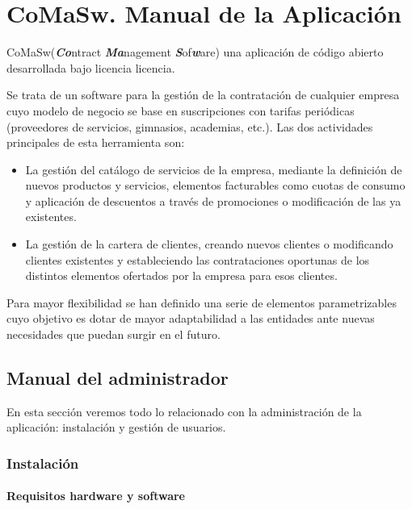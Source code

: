 \chapter{CoMaSw. Manual de la Aplicación}
\label{chap:manual}

\lettrine{CoMaSw} (\emph{\textbf{Co}}ntract \emph{\textbf{Ma}}nagement \emph{\textbf{S}}of\emph{\textbf{w}}are) una aplicación de código abierto desarrollada bajo licencia \acrfull{licencia}.


Se trata de un software para la gestión de la contratación de cualquier empresa cuyo modelo de negocio se base en suscripciones con tarifas periódicas (proveedores de servicios, gimnasios, academias, etc.). Las dos actividades principales de esta herramienta son:
\begin{itemize}
\item La gestión del catálogo de servicios de la empresa, mediante la definición de nuevos productos y servicios, elementos facturables como cuotas de consumo y aplicación de descuentos a través de promociones o modificación de las ya existentes.
\item La gestión de la cartera de clientes, creando nuevos clientes o modificando clientes existentes y estableciendo las contrataciones oportunas de los distintos elementos ofertados por la empresa para esos clientes.
\end{itemize}

Para mayor flexibilidad se han definido una serie de elementos parametrizables cuyo objetivo es dotar de mayor adaptabilidad a las entidades ante nuevas necesidades que puedan surgir en el futuro.


\section{Manual del administrador}
\label{sec:manual-administrador}

En esta sección veremos todo lo relacionado con la administración de la aplicación: instalación y gestión de usuarios.

\subsection{Instalación}
\label{sub:instalacion}

\subsubsection{Requisitos hardware y software}
\label{sub:requisitos}

